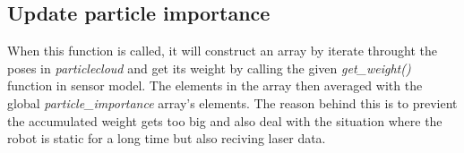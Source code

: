 \documentclass[11pt,a4paper]{article}
\begin{document}
      \subsection{Update particle importance}
      When this function is called, it will construct an array by iterate throught the poses in \textit{particlecloud} and get its weight by calling the given \textit{get\_weight()} 
      function in sensor model. The elements in the array then averaged with the global \textit{particle\_importance} array's elements. The reason behind this is to previent the accumulated
      weight gets too big and also deal with the situation where the robot is static for a long time but also reciving 
      laser data.
\end{document}
